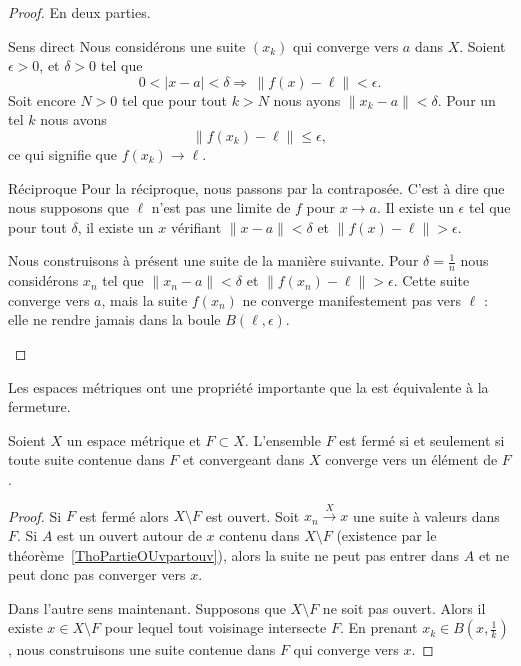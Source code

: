\begin{proof}
    En deux parties.
    \begin{subproof}
    \item[Sens direct]
        Nous considérons une suite \( (x_k)\) qui converge vers \( a\) dans \( X\). Soient \( \epsilon>0\), et \( \delta>0\) tel que 
        \begin{equation}
            0<| x-a |<\delta\Rightarrow\,\| f(x)-\ell \|<\epsilon.
        \end{equation}
        Soit encore \( N>0\) tel que pour tout \( k>N\) nous ayons \( \| x_k-a \|<\delta\). Pour un tel \( k\) nous avons
        \begin{equation}
            \| f(x_k)-\ell \|\leq \epsilon,
        \end{equation}
        ce qui signifie que \(f(x_k)\to \ell \).

    \item[Réciproque]
        Pour la réciproque, nous passons par la contraposée. C'est à dire que nous supposons que \( \ell\) n'est pas une limite de \( f\) pour \( x\to a\). Il existe un \( \epsilon\) tel que pour tout \( \delta\), il existe un \( x\) vérifiant \( \| x-a \|<\delta\) et \( \| f(x)-\ell \|>\epsilon\).

        Nous construisons à présent une suite de la manière suivante. Pour \( \delta=\frac{1}{ n }\) nous considérons \( x_n\) tel que \( \| x_n-a \|<\delta\) et \( \| f(x_n)-\ell \|>\epsilon\). Cette suite converge vers \( a\), mais la suite \( f(x_n)\) ne converge manifestement pas vers \( \ell\) : elle ne rendre jamais dans la boule \( B(\ell,\epsilon)\).
    \end{subproof}
\end{proof}

Les espaces métriques ont une propriété importante que la  est équivalente à la fermeture.
\begin{proposition}    \label{PropLFBXIjt}
    Soient \( X\) un espace métrique et \( F\subset X\). L'ensemble \( F\) est fermé si et seulement si toute suite contenue dans \( F\) et convergeant dans \( X\) converge vers un élément de \( F\).
\end{proposition}

\begin{proof}
    Si \( F\) est fermé alors \( X\setminus F\) est ouvert. Soit \( x_n\stackrel{X}{\longrightarrow}x\) une suite à valeurs dans \( F\). Si \( A\) est un ouvert autour de \( x\) contenu dans \( X\setminus F\) (existence par le théorème~\ref{ThoPartieOUvpartouv}), alors la suite ne peut pas entrer dans \( A\) et ne peut donc pas converger vers \( x\).

    Dans l'autre sens maintenant. Supposons que \( X\setminus F\) ne soit pas ouvert. Alors il existe \( x\in X\setminus F\) pour lequel tout voisinage intersecte \( F\). En prenant \( x_k\in B(x,\frac{1}{ k })\), nous construisons une suite contenue dans \( F\) qui converge vers \( x\).
\end{proof}

